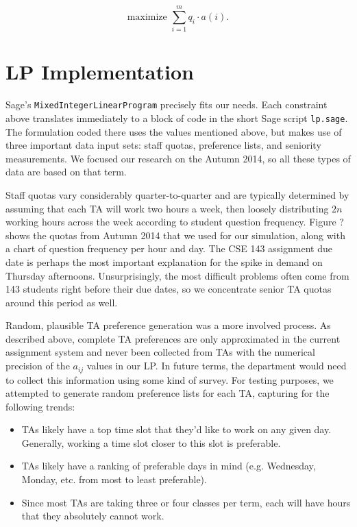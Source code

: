 \documentclass{article}
\begin{document}
\begin{multicols}{2}
\begin{equation}
\textrm{maximize } \sum_{i=1}^mq_i\cdot a(i).
\end{equation}

\section*{LP Implementation}

Sage's \texttt{MixedIntegerLinearProgram} precisely fits our needs. Each constraint above translates immediately to a block of code in the short Sage script \texttt{lp.sage}. The formulation coded there uses the values mentioned above, but makes use of three important data input sets: staff quotas, preference lists, and seniority measurements. We focused our research on the Autumn 2014, so all these types of data are based on that term.

Staff quotas vary considerably quarter-to-quarter and are typically determined by assuming that each TA will work two hours a week, then loosely distributing $2n$ working hours across the week according to student question frequency. Figure ? shows the quotas from Autumn 2014 that we used for our simulation, along with a chart of question frequency per hour and day. The CSE 143 assignment due date is perhaps the most important explanation for the spike in demand on Thursday afternoons. Unsurprisingly, the most difficult problems often come from 143 students right before their due dates, so we concentrate senior TA quotas around this period as well.

Random, plausible TA preference generation was a more involved process. As described above, complete TA preferences are only approximated in the current assignment system and never been collected from TAs with the numerical precision of the $a_{ij}$ values in our LP. In future terms, the department would need to collect this information using some kind of survey. For testing purposes, we attempted to generate random preference lists for each TA, capturing for the following trends:
\begin{itemize}
   \item TAs likely have a top time slot that they'd like to work on any given day. Generally, working a time slot closer to this slot is preferable.
   \item TAs likely have a ranking of preferable days in mind (e.g. Wednesday, Monday, etc. from most to least preferable).
   \item Since most TAs are taking three or four classes per term, each will have hours that they absolutely cannot work.
\end{itemize}


\end{multicols}
\end{document}
